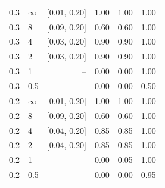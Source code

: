 \begin{tabular}{@{}llrrrr@{}}
0.3 & $\infty$ & [0.01, 0.20] & 1.00 & 1.00 & 1.00 \\
0.3 & 8 & [0.09, 0.20] & 0.60 & 0.60 & 1.00 \\
0.3 & 4 & [0.03, 0.20] & 0.90 & 0.90 & 1.00 \\
0.3 & 2 & [0.03, 0.20] & 0.90 & 0.90 & 1.00 \\
0.3 & 1 & -- & 0.00 & 0.00 & 1.00 \\
0.3 & 0.5 & -- & 0.00 & 0.00 & 0.50 \\
0.2 & $\infty$ & [0.01, 0.20] & 1.00 & 1.00 & 1.00 \\
0.2 & 8 & [0.09, 0.20] & 0.60 & 0.60 & 1.00 \\
0.2 & 4 & [0.04, 0.20] & 0.85 & 0.85 & 1.00 \\
0.2 & 2 & [0.04, 0.20] & 0.85 & 0.85 & 1.00 \\
0.2 & 1 & -- & 0.00 & 0.05 & 1.00 \\
0.2 & 0.5 & -- & 0.00 & 0.00 & 0.95 \\
\bottomrule
\end{tabular}